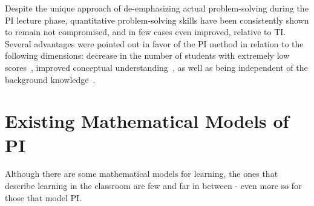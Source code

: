 \documentclass[twocolumn,secnumarabic,amssymb, nobibnotes, aps, prd]{revtex4-2}
\begin{document}
    Despite the unique approach of de-emphasizing actual problem-solving during the PI lecture phase, quantitative problem-solving skills have been consistently shown to remain not compromised, and in few cases even improved, relative to TI.
    Several advantages were pointed out in favor of the PI method in relation to the following dimensions: decrease in the number of students with extremely low scores~\cite{crouch2001peer,lasry2008peer,thacker1994comparing}, improved conceptual understanding~\cite{crouch2001peer}, as well as being independent of the background knowledge~\cite{lasry2008peer,tobias1990they}.





\section{Existing Mathematical Models of PI}

    Although there are some mathematical models for learning, the ones that describe learning in the classroom are few and far in between - even more so for those that model PI.
\end{document}
